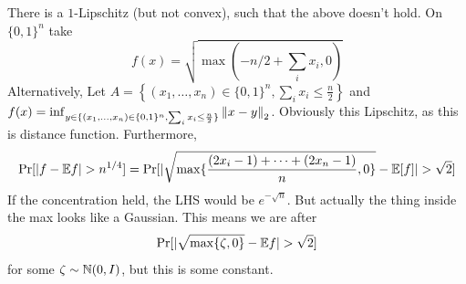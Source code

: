\begin{example}
    There is a $1$-Lipschitz (but not convex), such that the above doesn't hold.
    On $\{0, 1\}^n$ take
    \[ f(x) = \sqrt{\max(-n/2 + \sum_i x_i, 0)} \]
    Alternatively,
    Let $A = \left\{(x_1, \dots, x_n) \in \{0, 1\}^n, \sum_i x_i \le \frac{n}{2}\right\}$
    and $f(x) = \inf_{y \in \{ (x_1, \dots, x_n) \in \{0, 1\}^n, \sum_i x_i \le \frac{n}{2} \}} \norm{x -y}_2$.
    Obviously this Lipschitz, as this is distance function. Furthermore,
    \begin{align*}
        \textrm{Pr}[|f-\mathbb{E} f| > n^{1/4}] = \textrm{Pr}[|\sqrt{\max\{ \frac{(2 x_i - 1) + \dots + (2 x_n - 1)}{n}, 0\}} - \mathbb{E}[f]| > \sqrt{2}]
    \end{align*}
    If the concentration held, the LHS would be $e^{-\sqrt{n}}$. But actually the thing inside the max looks like a Gaussian.
    This means we are after
    \[ \textrm{Pr}[| \sqrt{\max\{\zeta, 0\}} - \mathbb{E} f| > \sqrt{2}] \]
    for some $\zeta \sim \operatorname{\mathbb{N}}(0, I)$, but this is some constant.
\end{example}